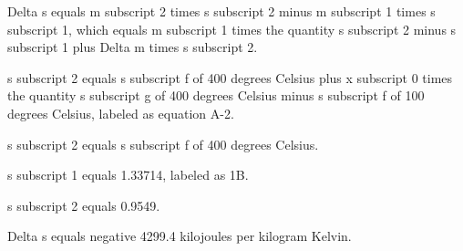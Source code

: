 Delta s equals m subscript 2 times s subscript 2 minus m subscript 1 times s subscript 1, which equals m subscript 1 times the quantity s subscript 2 minus s subscript 1 plus Delta m times s subscript 2.

s subscript 2 equals s subscript f of 400 degrees Celsius plus x subscript 0 times the quantity s subscript g of 400 degrees Celsius minus s subscript f of 100 degrees Celsius, labeled as equation A-2.

s subscript 2 equals s subscript f of 400 degrees Celsius.

s subscript 1 equals 1.33714, labeled as 1B.

s subscript 2 equals 0.9549.

Delta s equals negative 4299.4 kilojoules per kilogram Kelvin.